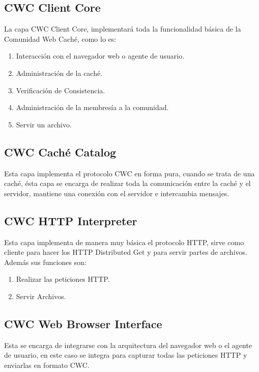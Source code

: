 \subsection{CWC Client Core}
La capa CWC Client Core, implementará toda la funcionalidad básica de la Comunidad Web Caché, como lo es:

\begin{enumerate}
\item Interacción con el navegador web o agente de usuario.
\item Administración de la caché.
\item Verificación de Consistencia.
\item Administración de la membresía a la comunidad.
\item Servir un archivo.
\end{enumerate}

\subsection{CWC Caché Catalog}
Esta capa implementa el protocolo CWC en forma pura, cuando se trata de una caché, ésta capa se encarga de realizar toda la comunicación entre la caché y el servidor, mantiene una conexión con el servidor e intercambia mensajes. 

\subsection{CWC HTTP Interpreter}
Esta capa implementa de manera muy básica el protocolo HTTP, sirve como cliente para hacer los HTTP Distributed Get y para servir partes de archivos. Además sus funciones son:
\begin{enumerate}
\item Realizar las peticiones HTTP.
\item Servir Archivos.
\end{enumerate}

\subsection{CWC Web Browser Interface}
Esta se encarga de integrarse con la arquitectura del navegador web o el agente de usuario, en este caso se integra para capturar todas las peticiones HTTP y enviarlas en formato CWC.